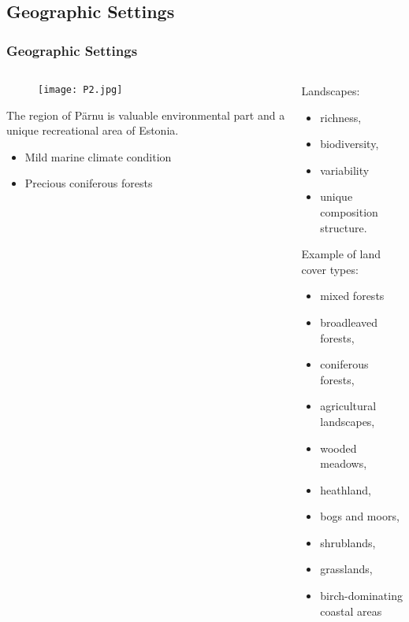 \documentclass[pdflatex,compress,8pt,
	xcolor={dvipsnames,dvipsnames,svgnames,x11names,table},
	hyperref={	
	breaklinks = true, 
	pdfauthor={Lemenkova Polina}, 
	pdfsubject={Preentation}, 
	pdfcreator={Lemenkova Polina}, 
	pdfproducer={Lemenkova Polina}, 
	colorlinks=true,
	linkcolor=Tomato, 
	citecolor=DeepPink3, 
	urlcolor = NavyBlue, 
	breaklinks = true}]{beamer}
\begin{document}
\subsection{Geographic Settings}
\begin{frame}\frametitle{Geographic Settings}
\begin{minipage}[0.4\textheight]{\textwidth}
\begin{columns}[T]
\begin{column}{0.4\textwidth}
\vspace{3em}
\begin{figure}[H]
	\centering
		\texttt{[image: P2.jpg]}
\end{figure}
The region of Pärnu is valuable environmental part and a unique recreational area of Estonia. 
\begin{itemize}
	\item Mild marine climate condition
	\item Precious coniferous forests
\end{itemize}
\end{column}
%
\begin{column}{0.6\textwidth}
\vspace{3em}

Landscapes: 
\begin{itemize}
	\item richness, 
	\item biodiversity, 
	\item variability 
	\item unique composition structure.
\end{itemize}
Example of land cover types:
\begin{itemize}
	\item mixed forests
	\item broadleaved forests,
	\item coniferous forests,
	\item agricultural landscapes, 
	\item wooded meadows,
	\item heathland, 
	\item bogs and moors,
	\item shrublands,
	\item grasslands, 
	\item birch-dominating coastal areas
\end{itemize}
\end{column}
\end{columns}
\end{minipage}
\end{frame} 
\end{document}
